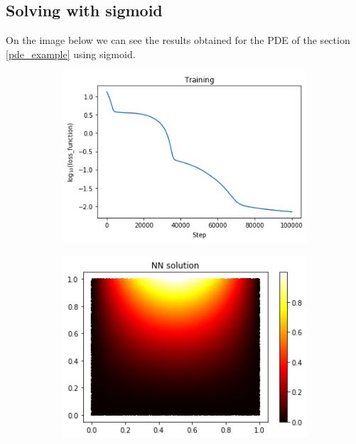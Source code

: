 \subsection{Solving with sigmoid}
On the image below we can see the results obtained for the PDE of the section \ref{pde_example} using sigmoid.
\vspace{-0.85cm}
\begin{figure}[H]
\begin{subfigure}{.45\textwidth}
    \centering
    \includegraphics[width=.8\linewidth]{images/NN_Jax_PDE8_files_sigmoid/NN_Jax_PDE8_18_1.png}
    \label{fig:sub1}
\end{subfigure}%
\begin{subfigure}{0.45\textwidth}
    \centering
    \includegraphics[width=0.8\linewidth]{images/NN_Jax_PDE8_files_sigmoid/NN_Jax_PDE8_20_0.png}
    \label{fig:sub2}
\end{subfigure}
\newline
\begin{subfigure}{.45\textwidth}
    \centering

\end{subfigure}
\end{figure}
